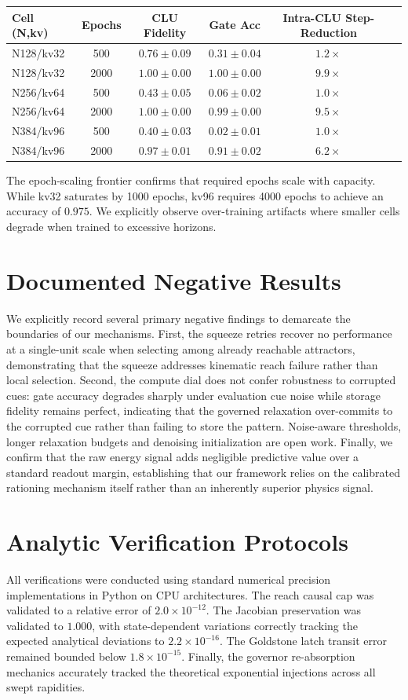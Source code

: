 \documentclass{article}
\begin{document}
\begin{center}\footnotesize
\begin{tabular}{lccccc}
\toprule
Cell (N,kv) & Epochs & CLU Fidelity & Gate Acc & Intra-CLU Step-Reduction \\
\midrule
N128/kv32 & 500 & $0.76\pm0.09$ & $0.31\pm0.04$ & $1.2\times$ \\
N128/kv32 & 2000 & $1.00\pm0.00$ & $1.00\pm0.00$ & $9.9\times$ \\
N256/kv64 & 500 & $0.43\pm0.05$ & $0.06\pm0.02$ & $1.0\times$ \\
N256/kv64 & 2000 & $1.00\pm0.00$ & $0.99\pm0.00$ & $9.5\times$ \\
N384/kv96 & 500 & $0.40\pm0.03$ & $0.02\pm0.01$ & $1.0\times$ \\
N384/kv96 & 2000 & $0.97\pm0.01$ & $0.91\pm0.02$ & $6.2\times$ \\
\bottomrule
\end{tabular}
\end{center}

The epoch-scaling frontier confirms that required epochs scale with capacity. While kv32 saturates by 1000 epochs, kv96 requires 4000 epochs to achieve an accuracy of $0.975$. We explicitly observe over-training artifacts where smaller cells degrade when trained to excessive horizons.

\section{Documented Negative Results}
We explicitly record several primary negative findings to demarcate the boundaries of our mechanisms. First, the squeeze retries recover no performance at a single-unit scale when selecting among already reachable attractors, demonstrating that the squeeze addresses kinematic reach failure rather than local selection. Second, the compute dial does not confer robustness to corrupted cues: gate accuracy degrades sharply under evaluation cue noise while storage fidelity remains perfect, indicating that the governed relaxation over-commits to the corrupted cue rather than failing to store the pattern. Noise-aware thresholds, longer relaxation budgets and denoising initialization are open work. Finally, we confirm that the raw energy signal adds negligible predictive value over a standard readout margin, establishing that our framework relies on the calibrated rationing mechanism itself rather than an inherently superior physics signal.

\section{Analytic Verification Protocols}
All verifications were conducted using standard numerical precision implementations in Python on CPU architectures. The reach causal cap was validated to a relative error of $2.0\times10^{-12}$. The Jacobian preservation was validated to $1.000$, with state-dependent variations correctly tracking the expected analytical deviations to $2.2\times10^{-16}$. The Goldstone latch transit error remained bounded below $1.8\times10^{-15}$. Finally, the governor re-absorption mechanics accurately tracked the theoretical exponential injections across all swept rapidities.
\end{document}
